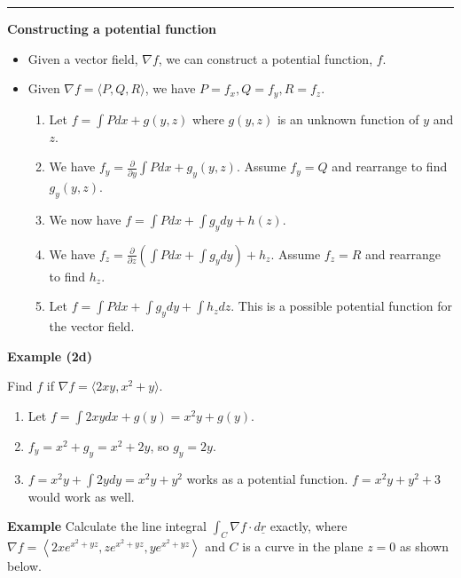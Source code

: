 \documentclass[12pt,letterpaper,noanswers]{exam}
\newcommand{\mb}[1]{\underline{#1}}
\begin{document}


\vspace{0.2cm}
\hrule
\vspace{0.2cm}


\noindent\textbf{Constructing a potential function}
\begin{tcolorbox}
\begin{itemize}
    \item Given a vector field, $\nabla f$, we can construct a potential function, $f$.
    \item Given $\nabla f= \langle P,Q,R\rangle$, we have $P =f_x, Q=f_y, R=f_z$.  
\begin{enumerate}
    \item Let $f = \int P dx + g(y,z)$ where $g(y,z)$ is an unknown function of $y$ and $z$.  
    \item We have $f_y = \frac{\partial}{\partial y}\int P dx + g_y(y,z)$.  Assume $f_y = Q$ and rearrange to find $g_y(y,z)$.
    \item We now have $f = \int P dx + \int g_y dy + h(z)$.
    \item We have $f_z = \frac{\partial}{\partial z}\left(\int P dx +\int g_y dy \right)+ h_z$. Assume $f_z = R$ and rearrange to find $h_z$.
    \item Let $f = \int P dx + \int g_y dy + \int h_z dz$.  This is a possible potential function for the vector field.
\end{enumerate} 
\end{itemize}
\end{tcolorbox}
\noindent\textbf{Example (2d)}

Find $f$ if $\nabla f = \langle 2xy, x^2+y\rangle$.

\begin{enumerate}
    \item Let $f = \int 2xy dx + g(y) = x^2y + g(y)$.
    \item $f_y = x^2 + g_y = x^2+2y$, so $g_y = 2y$.
    \item $f = x^2y + \int 2ydy = x^2y + y^2$ works as a potential function.  $f=x^2y+y^2+3$ would work as well.
\end{enumerate}

\noindent\textbf{Example}
Calculate the line integral $\int_C \nabla f \cdot d\mb r$ exactly, where $\displaystyle\nabla f = \left\langle 2xe^{x^2+yz}, ze^{x^2+yz}, ye^{x^2+yz}\right\rangle$ and $C$ is a curve in the plane $z=0$ as shown below.
\end{document}
